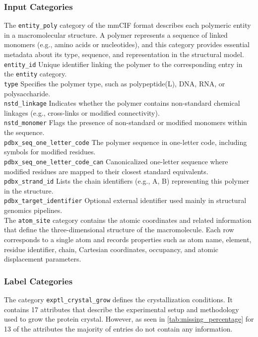 \subsubsection*{Input Categories}

The \texttt{entity\_poly} category of the mmCIF format describes each polymeric entity in a macromolecular structure. A polymer represents a sequence of linked monomers (e.g., amino acids or nucleotides), and this category provides essential metadata about its type, sequence, and representation in the structural model.
\texttt{entity\_id} Unique identifier linking the polymer to the corresponding entry in the \texttt{entity} category. \\
\texttt{type} Specifies the polymer type, such as polypeptide(L), DNA, RNA, or polysaccharide. \\
\texttt{nstd\_linkage} Indicates whether the polymer contains non-standard chemical linkages (e.g., cross-links or modified connectivity). \\
\texttt{nstd\_monomer} Flags the presence of non-standard or modified monomers within the sequence. \\
\texttt{pdbx\_seq\_one\_letter\_code} The polymer sequence in one-letter code, including symbols for modified residues. \\
\texttt{pdbx\_seq\_one\_letter\_code\_can} Canonicalized one-letter sequence where modified residues are mapped to their closest standard equivalents. \\
\texttt{pdbx\_strand\_id} Lists the chain identifiers (e.g., A, B) representing this polymer in the structure. \\
\texttt{pdbx\_target\_identifier} Optional external identifier used mainly in structural genomics pipelines. \\

The \texttt{atom\_site} category contains the atomic coordinates and related information that define the three-dimensional structure of the macromolecule. Each row corresponds to a single atom and records properties such as atom name, element, residue identifier, chain, Cartesian coordinates, occupancy, and atomic displacement parameters.

\subsubsection*{Label Categories}
The category \texttt{exptl\_crystal\_grow} defines the crystallization conditions. It contains 17 attributes that describe the experimental setup and methodology used to grow the protein crystal. However, as seen in \autoref{tab:missing_percentage} for 13 of the attributes the majority of entries do not contain any information. \\


